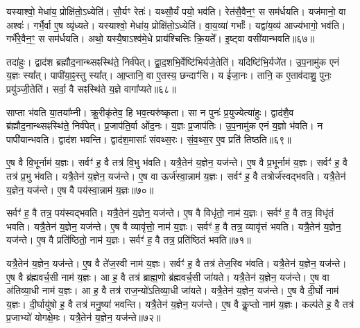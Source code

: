 यस्याश्वो॒ मेधा॑य॒ प्रोक्षि॑तो॒\-ऽध्येति॑।
सौ॒र्यꣳ रेतः॑।
यथ्सौ॒र्यं पयो॒ भव॑ति।
रेत॑सै॒वैन॒ꣳ॒ स सम॑र्धयति।
यज॑मानो॒ वा अश्वः॑।
गर्भै॒र्वा ए॒ष व्यृ॑ध्यते।
यस्याश्वो॒ मेधा॑य॒ प्रोक्षि॑तो॒\-ऽध्येति॑।
वा॒य॒व्या॑ गर्भाः᳚।
यद्वा॑य॒व्य॑ आज्य॑भागो॒ भव॑ति।
गर्भै॑रे॒वैन॒ꣳ॒ स सम॑र्धयति।
अथो॒ यस्यै॒षा\-ऽश्व॑मे॒धे प्राय॑श्चित्तिः क्रि॒यते᳚।
इ॒ष्ट्वा वसी॑यान्भवति॥६७॥\ip\anuvakamend[वि॒न्दत्यश्लो॑णो है॒व भ॑वत्यधी॒यादृ॑ध्यते॒ गर्भै॑रे॒वैन॒ꣳ॒ स सम॑र्धयति॒ द्वे च॑]

तदा॑हुः।
द्वाद॑श ब्रह्मौद॒नान्थ्सꣴस्थि॑ते॒ निर्व॑पेत्।
द्वा॒द॒शभि॒र्वेष्टि॑\-भिर्यजे॒तेति॑।
यदिष्टि॑भि॒र्यजे॑त।
उ॒प॒नामु॑क एनं य॒ज्ञः स्या᳚त्।
पापी॑या॒ꣴ॒स्तु स्या᳚त्।
आ॒प्तानि॒ वा ए॒तस्य॒ छन्दाꣳ॑सि।
य ई॑जा॒नः।
तानि॒ क ए॒ताव॑दाशु॒ पुनः॒ प्रयु॑ञ्जी॒तेति॑।
सर्वा॒ वै सꣴस्थि॑ते य॒ज्ञे वागा᳚प्यते॥६८॥\ip

साप्ता भ॑वति या॒तया᳚म्नी।
क्रू॒रीकृ॑तेव॒ हि भव॒त्यरु॑ष्कृता।
सा न पुनः॑ प्र॒युज्येत्या॑हुः।
द्वाद॑शै॒व ब्र॑ह्मौद॒नान्थ्सꣴस्थि॑ते॒ निर्व॑पेत्।
प्र॒जा\-प॑ति॒र्वा ओ॑द॒नः।
य॒ज्ञः प्र॒जा\-प॑तिः।
उ॒प॒नामु॑क एनं य॒ज्ञो भ॑वति।
न पापी॑यान्भवति।
द्वाद॑श भवन्ति।
द्वाद॑श॒मासाः᳚ संवथ्स॒रः।
सं॒व॒थ्स॒र ए॒व प्रति॑ तिष्ठति॥६९॥\ip\anuvakamend[आ॒प्य॒ते॒ सं॒व॒थ्स॒र एकं॑ च]

ए॒ष वै वि॒भूर्नाम॑ य॒ज्ञः।
सर्वꣳ॑ ह॒ वै तत्र॑ वि॒भु भ॑वति।
यत्रै॒\-तेन॑ य॒ज्ञेन॒ यज॑न्ते।
ए॒ष वै प्र॒भूर्नाम॑ य॒ज्ञः।
सर्वꣳ॑ ह॒ वै तत्र॑ प्र॒भु भ॑वति।
यत्रै॒तेन॑ य॒ज्ञेन॒ यज॑न्ते।
ए॒ष वा ऊर्ज॑स्वा॒न्नाम॑ य॒ज्ञः।
सर्वꣳ॑ ह॒ वै तत्रो\-र्ज॑\-स्वद्\-भवति।
यत्रै॒तेन॑ य॒ज्ञेन॒ यज॑न्ते।
ए॒ष वै पय॑स्वा॒न्नाम॑ य॒ज्ञः॥७०॥\ip

सर्वꣳ॑ ह॒ वै तत्र॒ पय॑स्वद्भवति।
यत्रै॒तेन॑ य॒ज्ञेन॒ यज॑न्ते।
ए॒ष वै विधृ॑तो॒ नाम॑ य॒ज्ञः।
सर्वꣳ॑ ह॒ वै तत्र॒ विधृ॑तं भवति।
यत्रै॒तेन॑ य॒ज्ञेन॒ यज॑न्ते।
ए॒ष वै व्यावृ॑त्तो॒ नाम॑ य॒ज्ञः।
सर्वꣳ॑ ह॒ वै तत्र॒ व्यावृ॑त्तं भवति।
यत्रै॒तेन॑ य॒ज्ञेन॒ यज॑न्ते।
ए॒ष वै प्रति॑\-ष्ठितो॒ नाम॑ य॒ज्ञः।
सर्वꣳ॑ ह॒ वै तत्र॒ प्रति॑\-ष्ठितं भवति॥७१॥\ip

यत्रै॒तेन॑ य॒ज्ञेन॒ यज॑न्ते।
ए॒ष वै ते॑ज॒स्वी नाम॑ य॒ज्ञः।
सर्वꣳ॑ ह॒ वै तत्र॑ तेज॒स्वि भ॑वति।
यत्रै॒तेन॑ य॒ज्ञेन॒ यज॑न्ते।
ए॒ष वै ब्र॑ह्म\-वर्च॒सी नाम॑ य॒ज्ञः।
आ ह॒ वै तत्र॑ ब्राह्म॒णो ब्र॑ह्म\-वर्च॒सी जा॑यते।
यत्रै॒तेन॑ य॒ज्ञेन॒ यज॑न्ते।
ए॒ष वा अ॑तिव्या॒धी नाम॑ य॒ज्ञः।
आ ह॒ वै तत्र॑ राज॒न्यो॑\-ऽतिव्या॒धी जा॑यते।
यत्रै॒तेन॑ य॒ज्ञेन॒ यज॑न्ते।
ए॒ष वै दी॒र्घो नाम॑ य॒ज्ञः।
दी॒र्घायु॑षो ह॒ वै तत्र॑ मनु॒ष्या॑ भवन्ति।
यत्रै॒तेन॑ य॒ज्ञेन॒ यज॑न्ते।
ए॒ष वै कॢ॒प्तो नाम॑ य॒ज्ञः।
कल्प॑ते ह॒ वै तत्र॑ प्र॒जाभ्यो॑ योगक्षे॒मः।
यत्रै॒तेन॑ य॒ज्ञेन॒ यज॑न्ते॥७२॥\ip\anuvakamend[पय॑स्वा॒न्नाम॑ य॒ज्ञः प्रति॑\-ष्ठितं भवति॒ यत्रै॒तेन॑ य॒ज्ञेन॒ यज॑न्ते॒ षट्च॑ (ए॒ष वै विभूः प्र॒भूरूर्ज॑स्वा॒न्पय॑स्वा॒न् विधृ॑तो॒ व्यावृ॑त्तः॒ प्रति॑\-ष्ठितस्तेज॒स्वी ब्र॑ह्म\-वर्च॒स्य॑तिव्या॒धी दी॒र्घः कॢ॒प्तो द्वाद॑श॥)]

